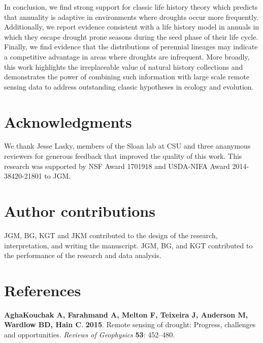 \documentclass[man,floatsintext]{apa6}
\theoremstyle{definition}
\theoremstyle{definition}
\theoremstyle{definition}
\theoremstyle{remark}
\begin{document}
In conclusion, we find strong support for classic life history theory
which predicts that annuality is adaptive in environments where droughts
occur more frequently. Additionally, we report evidence consistent with
a life history model in annuals in which they escape drought prone
seasons during the seed phase of their life cycle. Finally, we find
evidence that the distributions of perennial lineages may indicate a
competitive advantage in areas where droughts are infrequent. More
broadly, this work highlights the irreplaceable value of natural history
collections and demonstrates the power of combining such information
with large scale remote sensing data to address outstanding classic
hypotheses in ecology and evolution.

\hypertarget{acknowledgments}{%
\section{Acknowledgments}\label{acknowledgments}}

We thank Jesse Lasky, members of the Sloan lab at CSU and three
ananymous reviewers for generous feedback that improved the quality of
this work. This research was supported by NSF Award 1701918 and
USDA-NIFA Award 2014-38420-21801 to JGM.

\hypertarget{author-contributions}{%
\section{Author contributions}\label{author-contributions}}

JGM, BG, KGT and JKM contributed to the design of the research,
interpretation, and writing the manuscript. JGM, BG, and KGT contributed
to the performance of the research and data analysis.

\hypertarget{references}{%
\section{References}\label{references}}

\begingroup
\setlength{\parindent}{-0.5in}
\setlength{\leftskip}{0.5in}

\hypertarget{refs}{}
\leavevmode\hypertarget{ref-aghakouchak2015remote}{}%
\textbf{\textnormal{AghaKouchak A}, \textnormal{Farahmand A},
\textnormal{Melton F}, \textnormal{Teixeira J}, \textnormal{Anderson M},
\textnormal{Wardlow BD}, \textnormal{Hain C}}. \textbf{2015}. Remote
sensing of drought: Progress, challenges and opportunities.
\emph{Reviews of Geophysics} \textbf{53}: 452--480.
\end{document}
